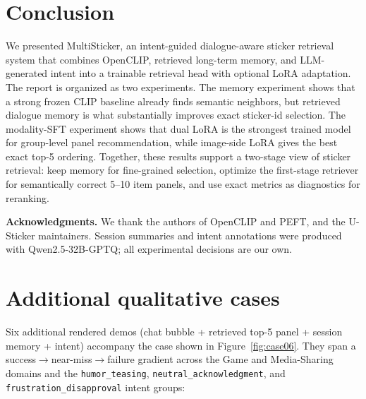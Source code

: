 \documentclass[10pt,twocolumn,letterpaper]{article}
\begin{document}
\section{Conclusion}

We presented MultiSticker, an intent-guided dialogue-aware sticker
retrieval system that combines OpenCLIP, retrieved long-term memory, and
LLM-generated intent into a trainable retrieval head with optional LoRA
adaptation. The report is organized as two experiments. The memory experiment
shows that a strong frozen CLIP baseline already finds semantic neighbors, but
retrieved dialogue memory is what substantially improves exact sticker-id
selection. The modality-SFT experiment shows that dual LoRA is the strongest
trained model for group-level panel recommendation, while image-side LoRA gives
the best exact top-5 ordering. Together, these results support a two-stage view
of sticker retrieval: keep memory for fine-grained selection, optimize the
first-stage retriever for semantically correct 5--10 item panels, and use exact
metrics as diagnostics for reranking.

\noindent
{\bf Acknowledgments.} We thank the authors of OpenCLIP and PEFT, and the
U-Sticker maintainers. Session summaries and intent annotations were
produced with Qwen2.5-32B-GPTQ; all experimental decisions are our own.

{\small


}

\appendix
\section{Additional qualitative cases}
\label{app:cases}
Six additional rendered demos (chat bubble + retrieved top-5 panel +
session memory + intent) accompany the case shown in
Figure~\ref{fig:case06}. They span a success$\to$near-miss$\to$failure
gradient across the Game and Media-Sharing domains and the
\texttt{humor\_teasing}, \texttt{neutral\_acknowledgment}, and
\texttt{frustration\_disapproval} intent groups:
\end{document}
